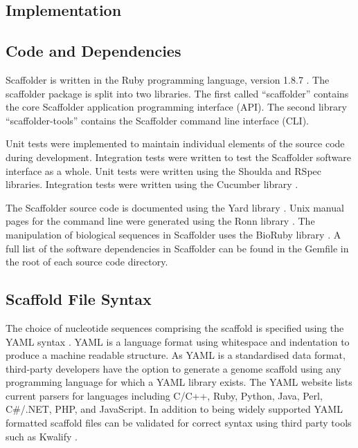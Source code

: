 \documentclass[10pt]{bmc_article}
\newenvironment{bmcformat}{\begin{raggedright}\baselineskip20pt\sloppy\setboolean{publ}{false}}{\end{raggedright}\baselineskip20pt\sloppy}
\begin{document}
\begin{bmcformat}
\clearpage

\section*{Implementation} %

\subsection*{Code and Dependencies} %

Scaffolder is written in the Ruby programming language, version 1.8.7
\cite{ruby-lang}. The scaffolder package is split into two libraries. The first
called ``scaffolder'' contains the core Scaffolder application programming
interface (API). The second library ``scaffolder-tools'' contains the
Scaffolder command line interface (CLI). \pb

Unit tests were implemented to maintain individual elements of the source code
during development. Integration tests were written to test the Scaffolder
software interface as a whole. Unit tests were written using the Shoulda and
RSpec \cite{rspec} libraries.  Integration tests were written using the
Cucumber library \cite{rspec}. \pb

The Scaffolder source code is documented using the Yard library \cite{yard}.
Unix manual pages for the command line were generated using the Ronn library
\cite{ronn}. The manipulation of biological sequences in Scaffolder uses the
BioRuby library \cite{goto2010}. A full list of the software dependencies in
Scaffolder can be found in the Gemfile in the root of each source code
directory. \pb

\subsection*{Scaffold File Syntax} %

The choice of nucleotide sequences comprising the scaffold is specified using
the YAML syntax \cite{yaml}. YAML is a language format using whitespace and
indentation to produce a machine readable structure. As YAML is a standardised
data format, third-party developers have the option to generate a genome
scaffold using any programming language for which a YAML library exists. The
YAML website lists current parsers for languages including C/C++, Ruby, Python,
Java, Perl, C\#/.NET, PHP, and JavaScript. In addition to being widely
supported YAML formatted scaffold files can be validated for correct syntax
using third party tools such as Kwalify \cite{kwalify}. \pb


\end{bmcformat}
\end{document}
